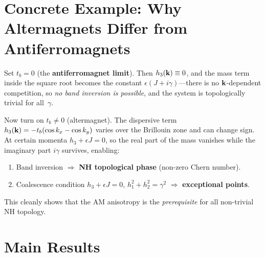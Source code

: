 \documentclass[11pt,a4paper]{article}
\begin{document}
\section{Concrete Example: Why Altermagnets Differ from Antiferromagnets}

Set $t_b = 0$ (the \textbf{antiferromagnet limit}).  Then $h_3(\vb{k}) \equiv 0$, and the mass term inside the square root becomes the constant $\epsilon(J+i\gamma)$---there is no $\vb{k}$-dependent competition, so \emph{no band inversion is possible}, and the system is topologically trivial for all~$\gamma$.

Now turn on $t_b \neq 0$ (altermagnet).  The dispersive term $h_3(\vb{k}) = -t_b(\cos k_x - \cos k_y)$ varies over the Brillouin zone and can change sign.  At certain momenta $h_3 + \epsilon J = 0$, so the real part of the mass vanishes while the imaginary part $i\gamma$ survives, enabling:
\begin{enumerate}[nosep]
  \item Band inversion $\Rightarrow$ \textbf{NH topological phase} (non-zero Chern number).
  \item Coalescence condition $h_3 + \epsilon J = 0$, $h_1^2 + h_2^2 = \gamma^2$ $\Rightarrow$ \textbf{exceptional points}.
\end{enumerate}
This cleanly shows that the AM anisotropy is the \emph{prerequisite} for all non-trivial NH topology.

\section{Main Results}
\end{document}
